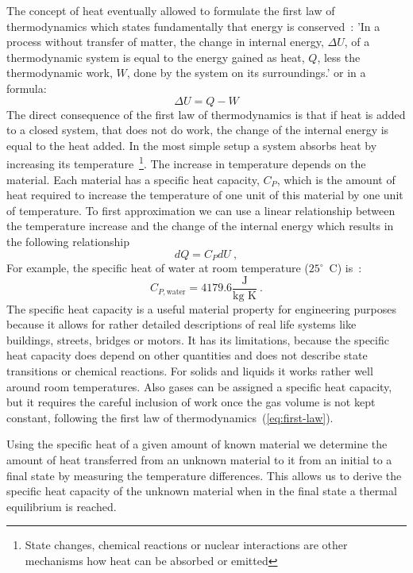 \documentclass[10pt,aps,twocolumn,secnumarabic,balancelastpage,amsmath,amssymb,nofootinbib,floatfix]{revtex4}
\begin{document}
The concept of heat eventually allowed to formulate the first law of thermodynamics which states fundamentally that energy is conserved~\cite{BailynThermo}: 'In a process without transfer of matter, the change in internal energy, $\Delta U$, of a thermodynamic system is equal to the energy gained as heat, $Q$, less the thermodynamic work, $W$, done by the system on its surroundings.' or in a formula:
\begin{equation}\label{eq:first-law}
\Delta U = Q - W
\end{equation}
The direct consequence of the first law of thermodynamics is that if heat is added to a closed system, that does not do work, the change of the internal energy is equal to the heat added. In the most simple setup a system absorbs heat by increasing its temperature~\footnote{State changes, chemical reactions or nuclear interactions are other mechanisms how heat can be absorbed or emitted}. The increase in temperature depends on the material. Each material has a specific heat capacity, $C_P$, which is the amount of heat required to increase the temperature of one unit of this material by one unit of temperature. To first approximation we can use a linear relationship between the temperature increase and the change of the internal energy which results in the following relationship
$$
dQ = C_P dU \ ,
$$
For example, the specific heat of water at room temperature ($25^\circ$~C) is~\cite{EnergyAndLight}:
$$
C_{P,\text{water}} = 4179.6 \frac{\text{J}}{\text{kg K}} \ .
$$
The specific heat capacity is a useful material property for engineering purposes because it allows for rather detailed descriptions of real life systems like buildings, streets, bridges or motors. It has its limitations, because the specific heat capacity does depend on other quantities and does not describe state transitions or chemical reactions. For solids and liquids it works rather well around room temperatures. Also gases can be assigned a specific heat capacity, but it requires the careful inclusion of work once the gas volume is not kept constant, following the first law of thermodynamics~(\ref{eq:first-law}).

Using the specific heat of a given amount of known material we determine the amount of heat transferred from an unknown material to it from an initial to a final state by measuring the temperature differences. This allows us to derive the specific heat capacity of the unknown material when in the final state a thermal equilibrium is reached.
\end{document}
